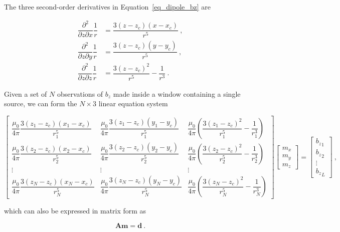 The three second-order derivatives in Equation~\ref{eq_dipole_bz} are

\begin{equation}
\begin{aligned}
\dfrac{\partial^2}{\partial z \partial x} \dfrac{1}{r} &=
\dfrac{3(z - z_c)(x - x_c)}{r^5}\ ,
\\
\dfrac{\partial^2}{\partial z \partial y} \dfrac{1}{r} &=
\dfrac{3(z - z_c)(y - y_c)}{r^5}\ ,
\\
\dfrac{\partial^2}{\partial z \partial z} \dfrac{1}{r} &=
\dfrac{3(z - z_c)^2}{r^5} - \dfrac{1}{r^3}\ .
\end{aligned}
\end{equation}

Given a set of $N$ observations of $b_z$ made inside a window containing a single source, we can form the $N \times 3$ linear equation system 

\begin{equation}
\label{CgjOtKLQKT}
\begin{bmatrix}
\dfrac{\mu_0}{4\pi}\dfrac{3(z_1 - z_c)(x_1 - x_c)}{r_1^5}
& \dfrac{\mu_0}{4\pi}\dfrac{3(z_1 - z_c)(y_1 - y_c)}{r_1^5}
& \dfrac{\mu_0}{4\pi}\left(\dfrac{3(z_1 - z_c)^2}{r_1^5} - \dfrac{1}{r_1^3}\right)
\\
\dfrac{\mu_0}{4\pi}\dfrac{3(z_2 - z_c)(x_2 - x_c)}{r_2^5}
& \dfrac{\mu_0}{4\pi}\dfrac{3(z_2 - z_c)(y_2 - y_c)}{r_2^5}
& \dfrac{\mu_0}{4\pi}\left(\dfrac{3(z_2 - z_c)^2}{r_2^5} - \dfrac{1}{r_2^3}\right)
\\
\vdots & \vdots & \vdots
\\
\dfrac{\mu_0}{4\pi}\dfrac{3(z_N - z_c)(x_N - x_c)}{r_N^5}
& \dfrac{\mu_0}{4\pi}\dfrac{3(z_N - z_c)(y_N - y_c)}{r_N^5}
& \dfrac{\mu_0}{4\pi}\left(\dfrac{3(z_N - z_c)^2}{r_N^5} - \dfrac{1}{r_N^3}\right)
\end{bmatrix}
\begin{bmatrix}
m_x \\ m_y \\ m_z
\end{bmatrix}
=
\begin{bmatrix}
{b_z}_1 \\ {b_z}_2 \\ \vdots \\ {b_z}_L
\end{bmatrix}
\ ,
\end{equation}

\noindent
which can also be expressed in matrix form as

\begin{equation}
\label{qdhqM4s9Ln}
\mathbf{A} \mathbf{m} = \mathbf{d} \ .
\end{equation}

